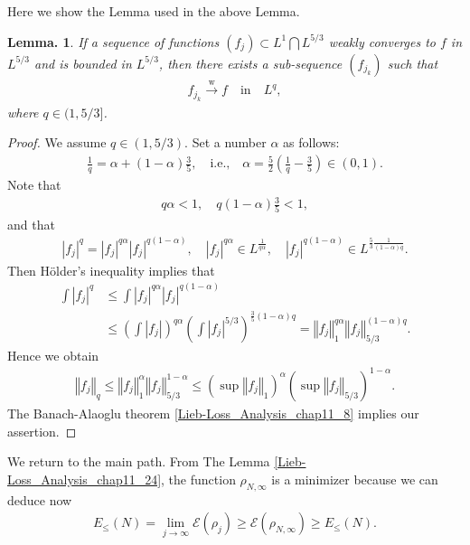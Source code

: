 \documentclass[openany, a4paper, oneside]{jsbook}
\theoremstyle{break}
\theoremstyle{breakdefn}
\newtheorem{lem}[thm]{Lemma.}
\newcommand{\abs}[1]{\left|#1\right|}
\newcommand{\norm}[1]{\left\Vert#1\right\Vert}
\newcommand{\rbk}[1]{\left (#1\right)}
\newcommand{\calE}{\mathcal{E}}
\newcommand{\EleqN}{E_{\leq}(N)}
\newcommand{\limjtoinfty}{\lim_{j \to \infty}}
\newcommand{\rhoNinfty}{\rho_{N, \infty}}
\newcommand{\wto}{\xrightarrow{\text{w}}}
\begin{document}
Here we show the Lemma used in the above Lemma.
\begin{lem}\label{Lieb-Loss_Analysis_chap11_23}
 If a sequence of functions $(f_j) \subset L^{1} \bigcap L^{5/3}$ weakly converges to $f$ in $L^{5/3}$ and is bounded in $L^{5/3}$,
 then there exists a sub-sequence $(f_{j_k})$ such that
 \begin{align}
  f_{j_k} \wto f \quad \mathrm{in} \quad L^q,
 \end{align}
 where $q \in (1, 5/3]$.
\end{lem}
\begin{proof}
We assume $q \in (1, 5/3)$.
Set a number $\alpha$ as follows:
\begin{align}
 \frac{1}{q}
 =
 \alpha + (1 - \alpha) \frac{3}{5}, \quad \text{i.e.,} \quad
 \alpha
 =
 \frac{5}{2} \rbk{\frac{1}{q} - \frac{3}{5}} \in \rbk{0, 1}.
\end{align}
Note that
\begin{align}
 q \alpha < 1, \quad q (1 - \alpha) \frac{3}{5} < 1,
\end{align}
and that
\begin{align}
 \abs{f_j}^{q}
 =
 \abs{f_j}^{q \alpha} \abs{f_j}^{q (1 - \alpha)}, \quad
 \abs{f_j}^{q \alpha} \in L^{\frac{1}{q \alpha}}, \quad
 \abs{f_j}^{q (1 - \alpha)} \in L^{\frac{5}{3} \frac{1}{(1 - \alpha) q}}.
\end{align}
Then H\"older's inequality implies that
\begin{align}
 \int \abs{f_j}^q
 &\leq
 \int \abs{f_j}^{q \alpha} \abs{f_j}^{q (1 - \alpha)} \\
 &\leq
 \rbk{\int \abs{f_j}}^{q \alpha} \rbk{\int \abs{f_j}^{5/3}}^{\frac{3}{5} (1 - \alpha) q}
 =
 \norm{f_j}_{1}^{q \alpha} \norm{f_j}_{5/3}^{(1 - \alpha) q}.
\end{align}
Hence we obtain
\begin{align}
 \norm{f_j}_{q}
 \leq
 \norm{f_j}_{1}^{\alpha} \norm{f_j}_{5/3}^{1 - \alpha}
 \leq
 \rbk{\sup \norm{f_j}_{1}}^{\alpha} \rbk{\sup \norm{f_j}_{5/3}}^{1 - \alpha}.
\end{align}
The Banach-Alaoglu theorem \ref{Lieb-Loss_Analysis_chap11_8} implies our assertion.
\end{proof}

We return to the main path.
From The Lemma \ref{Lieb-Loss_Analysis_chap11_24}, the function $\rhoNinfty$ is a minimizer because we can deduce now
\begin{align}
 \EleqN
 =
 \limjtoinfty \calE (\rho_j)
 \geq
 \calE (\rhoNinfty)
 \geq
 \EleqN.
\end{align}
\end{document}
